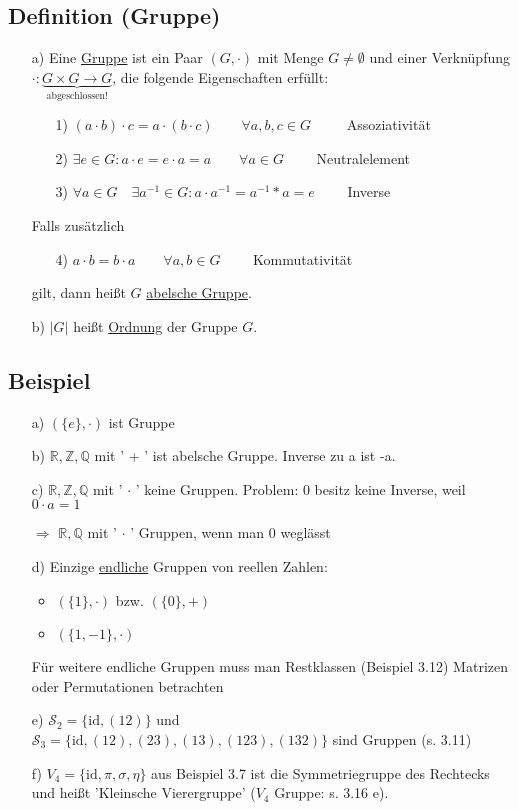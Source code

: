 \documentclass[12pt,titlepage, pdf]{article}
\newcommand{\R}{\mathds{R}}
\newcommand{\uline}[1]{\underline{#1}}
\newcommand{\id}{\textrm{id}}
\renewcommand{\>}{\rightarrow}
\renewcommand{\*}{\cdot}
\begin{document}
\subsection{Definition (Gruppe)}
\begin{itemize}
	\item[a)] Eine \uline{Gruppe} ist ein Paar $(G, \cdot) $ mit Menge $G \neq \emptyset$ und einer Verknüpfung $\cdot : \underbrace{G \times G \rightarrow G}_{\text{abgeschlossen!}}$, die folgende Eigenschaften erfüllt:
	\begin{itemize}
		\item[1)] $(a \cdot b) \cdot c = a \cdot (b \cdot c) \qquad \forall a,b,c \in G\qquad~$ Assoziativität
		\item[2)] $\exists e \in G: a \cdot e = e \cdot a = a \qquad \forall a \in G\qquad$ Neutralelement
		\item[3)] $\forall a \in G\quad \exists a^{-1} \in G: a \cdot a^{-1} = a^{-1}*a = e\qquad$ Inverse
	\end{itemize}
		Falls zusätzlich 
		\begin{itemize}
			\item[4)] $a \cdot b = b \cdot a \qquad  \forall a,b \in G\qquad$ Kommutativität \end{itemize}
		gilt, dann heißt $G$ \uline{abelsche Gruppe}.
	
	\item[b)] $| G |$ heißt \uline{Ordnung} der Gruppe $G$.
\end{itemize}
\subsection{Beispiel}
\begin{itemize}
	\item[a)] $(\{e\}, \cdot )$ ist Gruppe
	\item[b)] $\R, \mathds{Z}, \mathds{Q}$ mit ' + ' ist abelsche Gruppe. Inverse zu a ist -a.
	\item[c)] $\R, \mathds{Z}, \mathds{Q}$ mit ' $\cdot$ ' keine Gruppen. Problem: 0 besitz keine Inverse, weil \\
	$0 \cdot a = 1$\Lightning
	\item[$\Rightarrow$]  $\R, \mathds{Q}$ mit ' $\cdot$ ' Gruppen, wenn man 0 weglässt
	\item[d)] Einzige \uline{endliche} Gruppen von reellen Zahlen: 
	\begin{itemize}
		\item $(\{1\}, \cdot )$ bzw. $(\{0\}, + )$
		\item $(\{1,-1\}, \cdot)$
	\end{itemize}
	Für weitere endliche Gruppen muss man Restklassen (Beispiel 3.12) Matrizen oder Permutationen betrachten
	\item[e)] $\mathscr{S}_2 = \{\id, (12)\}$ und \\
	$\mathscr{S}_3 = \{\id, (12), (23),(13),(123),(132)\}$ sind Gruppen (s. 3.11)
	\item[f)] $V_4 = \{\id, \pi, \sigma, \eta \}$ aus Beispiel 3.7 ist die Symmetriegruppe des Rechtecks und heißt 'Kleinsche Vierergruppe' ($V_4$ Gruppe: s. 3.16 e).
\end{itemize}
\end{document}
